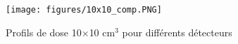 \documentclass{book}
\begin{document}

\begin{figure}[h]
  \centering
  \texttt{[image: figures/10x10\_comp.PNG]}
  \caption{Profils de dose 10$\times$10 cm$^3$ pour différents détecteurs}
  \label{fig_profils_10x10}
\end{figure}
\end{document}
